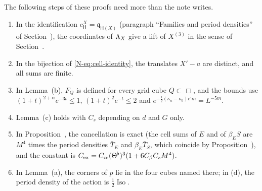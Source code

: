 \begin{detail}\label{xb:d-cells}
The following steps of these proofs need more than the note writes.
\begin{enumerate}[label=(\alph*)]
\item In the identification $c^X_{\mathsf H}=\mathfrak q_{\mathsf H(X)}$ (paragraph ``Families and period densities'' of Section~), the coordinates of $\Lambda_X$ give a lift of $X^{(3)}$ in the sense of Section~.
\item In the bijection of \eqref{N-eq:cell-identity}, the translates $X'-a$ are distinct, and all sums are finite.
\item In Lemma~(b), $F_Q$ is defined for every grid cube $Q\subset\Box$, and the bounds use $(1+t)^{2+\alpha}e^{-3t}\le1$, $(1+t)^2e^{-t}\le2$ and $e^{-\frac12(\kappa_n-\kappa_0)c'm}=L^{-5m}$.
\item Lemma~(c) holds with $C_s$ depending on $d$ and $G$ only.
\item In Proposition~, the cancellation is exact (the cell sums of $E$ and of $\beta_ES$ are $M^4$ times the period densities $\bar T_E$ and $\beta_E\bar T_S$, which coincide by Proposition~), and the constant is $C_{\rm ex}=C_{\rm cs}(\Theta^\flat)^3(1+6C_\beta C_sM^4)$.
\item In Lemma~(a), the corners of $p$ lie in the four cubes named there; in (d), the period density of the action is $\frac12\operatorname{Iso}$.
\end{enumerate}
\end{detail}

